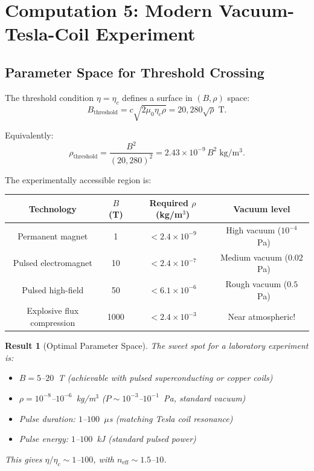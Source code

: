 \documentclass[11pt,a4paper]{article}
\newtheorem{result}{Result}
\begin{document}
\section{Computation 5: Modern Vacuum-Tesla-Coil Experiment}\label{sec:modern}

\subsection{Parameter Space for Threshold Crossing}

The threshold condition $\eta = \eta_c$ defines a surface in $(B, \rho)$ space:
\begin{equation}
B_{\mathrm{threshold}} = c\sqrt{2\mu_0\eta_c\rho} = 20{,}280\sqrt{\rho}\;\mathrm{T}.
\end{equation}

Equivalently:
\begin{equation}\label{eq:surface}
\rho_{\mathrm{threshold}} = \frac{B^2}{(20{,}280)^2} = 2.43 \times 10^{-9}\,B^2\;\mathrm{kg/m^3}.
\end{equation}

The experimentally accessible region is:

\begin{center}
\begin{tabular}{cccc}
\toprule
\textbf{Technology} & $B$ (T) & \textbf{Required} $\rho$ (kg/m$^3$) & \textbf{Vacuum level} \\
\midrule
Permanent magnet & 1 & $< 2.4 \times 10^{-9}$ & High vacuum ($10^{-4}$~Pa) \\
Pulsed electromagnet & 10 & $< 2.4 \times 10^{-7}$ & Medium vacuum ($0.02$~Pa) \\
Pulsed high-field & 50 & $< 6.1 \times 10^{-6}$ & Rough vacuum ($0.5$~Pa) \\
Explosive flux compression & 1000 & $< 2.4 \times 10^{-3}$ & Near atmospheric! \\
\bottomrule
\end{tabular}
\end{center}

\begin{result}[Optimal Parameter Space]
The sweet spot for a laboratory experiment is:
\begin{itemize}
\item $B = 5$--$20$~T (achievable with pulsed superconducting or copper coils)
\item $\rho = 10^{-8}$--$10^{-6}$~kg/m$^3$ ($P \sim 10^{-3}$--$10^{-1}$~Pa, standard vacuum)
\item Pulse duration: $1$--$100$~$\mu$s (matching Tesla coil resonance)
\item Pulse energy: $1$--$100$~kJ (standard pulsed power)
\end{itemize}

This gives $\eta/\eta_c \sim 1$--$100$, with $n_{\mathrm{eff}} \sim 1.5$--$10$.
\end{result}
\end{document}
